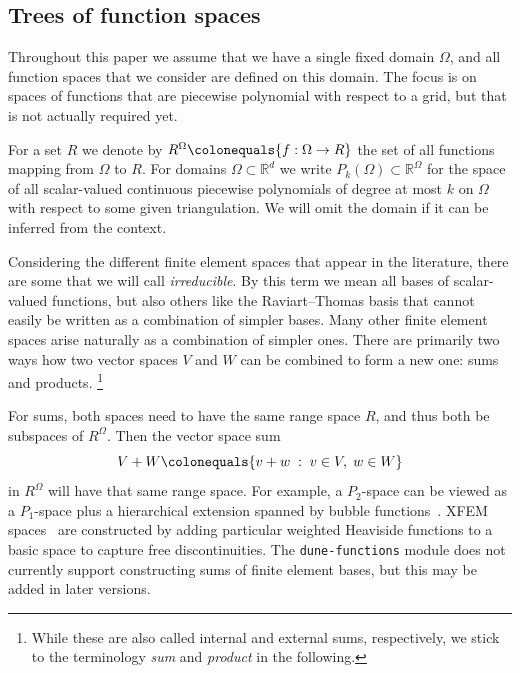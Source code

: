 \documentclass[a4paper,10pt,headings=normal,bibliography=totoc]{scrartcl}
\newcommand{\R}{\mathbb{R}}
\newcommand{\dunemodule}[1]{\texttt{#1}}
\begin{document}
\subsection{Trees of function spaces}

Throughout this paper we assume that we have a single fixed domain $\Omega$, and all function spaces
that we consider are defined on this domain.  The focus is on spaces of functions that are
piecewise polynomial with respect to a grid, but that is not actually required yet.

For a set $R$ we denote by $R^\Omega \colonequals \{f:\Omega \to R\}$
the set of all functions mapping from $\Omega$ to $R$. For domains $\Omega\subset \R^d$
we write $P_k(\Omega) \subset \R^\Omega$ for the space of all
scalar-valued continuous piecewise polynomials of degree at most $k$ on $\Omega$
with respect to some given triangulation.
We will omit the domain if it can be inferred from the context.

Considering the different finite element spaces that appear in the literature, there are some that we will
call \emph{irreducible}.  By this term we mean all bases of scalar-valued functions,
but also others like the Raviart--Thomas basis that cannot easily be written as a combination
of simpler bases.
Many other finite element spaces arise naturally as a combination of simpler ones.
There are primarily two ways how two vector spaces $V$ and $W$ can be combined
to form a new one: sums and products.%
%
\footnote{While these are also called
internal and external sums, respectively, we stick to the terminology
\emph{sum} and \emph{product} in the following.
}

For sums, both spaces need to
have the same range space $R$, and thus both be subspaces of $R^\Omega$.
Then the vector space sum
\begin{equation*}
  V + W
  \colonequals
  \{ v + w \; : \; v \in V, \; w \in W \}
\end{equation*}
in $R^\Omega$ will have that same range space.
For example, a $P_2$-space
can be viewed as a $P_1$-space plus a hierarchical extension spanned by bubble functions~\cite{bank:1996}.
XFEM spaces~\cite{moes_dolbow_belytschko:1999} are constructed by adding particular weighted Heaviside
functions to a basic space to capture free discontinuities.
The \dunemodule{dune-functions} module does not currently support constructing sums
of finite element bases, but this may be added in later versions.
\end{document}

